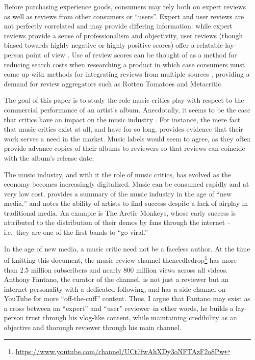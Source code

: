 \documentclass[
  11pt,
]{article}
\begin{document}
Before purchasing experience goods, consumers may rely both on expert
reviews as well as reviews from other consumers or ``users''. Expert and
user reviews are not perfectly correlated and may provide differing
information: while expert reviews provide a sense of professionalism and
objectivity, user reviews (though biased towards highly negative or
highly positive scores) offer a relatable lay-person point of view
\citep{amblee2007freeware}. Use of review scores can be thought of as a
method for reducing search costs when researching a product
\citep{huang2009searching} in which case consumers must come up with
methods for integrating reviews from multiple sources
\citep{west1998integrating}, providing a demand for review aggregators
such as Rotten Tomatoes and Metacritic.

The goal of this paper is to study the role music critics play with
respect to the commercial performance of an artist's album. Anecdotally,
it seems to be the case that critics have an impact on the music
industry \citep{brennan2006rough}. For instance, the mere fact that
music critics exist at all, and have for so long, provides evidence that
their work serves a need in the market. Music labels would seem to
agree, as they often provide advance copies of their albums to reviewers
so that reviews can coincide with the album's release date.

The music industry, and with it the role of music critics, has evolved
as the economy becomes increasingly digitalized. Music can be consumed
rapidly and at very low cost. \citet{waldfogel201514} provides a summary
of the music industry in the age of ``new media,'' and notes the ability
of artists to find success despite a lack of airplay in traditional
media. An example is The Arctic Monkeys, whose early success is
attributed to the distribution of their demos by fans through the
internet \citep{morey2008arctic}--i.e.~they are one of the first bands
to ``go viral.''

In the age of new media, a music critic need not be a faceless author.
At the time of knitting this document, the music review channel
theneedledrop\footnote{\url{https://www.youtube.com/channel/UCt7fwAhXDy3oNFTAzF2o8Pw}}
has more than 2.5 million subscribers and nearly 800 million views
across all videos. Anthony Fantano, the curator of the channel, is not
just a reviewer but an internet personality with a dedicated following,
and has a side channel on YouTube for more ``off-the-cuff'' content.
Thus, I argue that Fantano may exist as a cross between an ``expert''
and ``user'' reviewer--in other words, he builds a lay-person trust
through his vlog-like content, while maintaining credibility as an
objective and thorough reviewer through his main channel.
\end{document}
